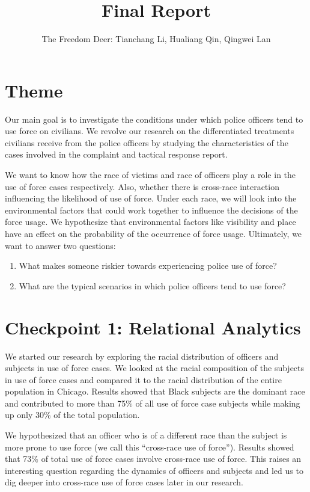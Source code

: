 \documentclass[10pt]{article}
\title{Final Report}
\author{The Freedom Deer: Tianchang Li, Hualiang Qin, Qingwei Lan}
\begin{document}
\maketitle



\section*{Theme}

Our main goal is to investigate the conditions under which police officers tend to use force on civilians. We revolve our research on the differentiated treatments civilians receive from the police officers by studying the characteristics of the cases involved in the complaint and tactical response report. 

We want to know how the race of victims and race of officers play a role in the use of force cases respectively. Also, whether there is cross-race interaction influencing the likelihood of use of force. Under each race, we will look into the environmental factors that could work together to influence the decisions of the force usage. We hypothesize that environmental factors like visibility and place have an effect on the probability of the occurrence of force usage. Ultimately, we want to answer two questions:

\begin{enumerate}[noitemsep]
\item What makes someone riskier towards experiencing police use of force?
\item What are the typical scenarios in which police officers tend to use force?
\end{enumerate}



\section*{Checkpoint 1: Relational Analytics}

We started our research by exploring the racial distribution of officers and subjects in use of force cases. We looked at the racial composition of the subjects in use of force cases and compared it to the racial distribution of the entire population in Chicago. Results showed that Black subjects are the dominant race and contributed to more than 75\% of all use of force case subjects while making up only 30\% of the total population.

We hypothesized that an officer who is of a different race than the subject is more prone to use force (we call this “cross-race use of force”). Results showed that 73\% of total use of force cases involve cross-race use of force. This raises an interesting question regarding the dynamics of officers and subjects and led us to dig deeper into cross-race use of force cases later in our research.
\end{document}

